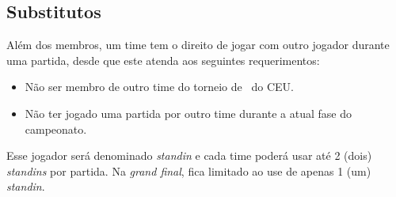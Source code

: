 \subsection{Substitutos}

Além dos membros, um time tem o direito de jogar com outro jogador durante uma partida, desde que este atenda aos seguintes requerimentos:

\begin{itemize}
    \item Não ser membro de outro time do torneio de \Modality\ do CEU.
    \item Não ter jogado uma partida por outro time durante a atual fase do campeonato.
\end{itemize}

Esse jogador será denominado \textit{standin} e cada time poderá usar até 2 (dois) \textit{standins} por partida. Na \textit{grand final}, fica limitado ao use de apenas 1 (um) \textit{standin}.